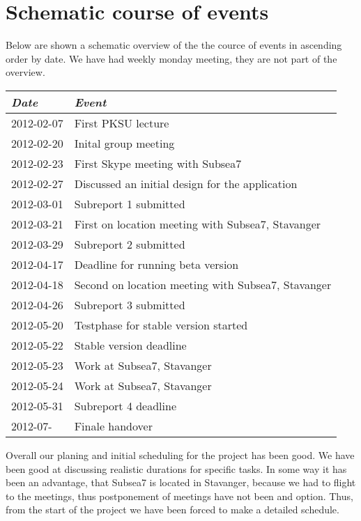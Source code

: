 \section{Schematic course of events }
Below are shown a schematic overview of the the cource of events in ascending order by date. We have had weekly monday meeting, they are not part of the overview.
\begin{center}
    \begin{tabular}{ll}
    \emph{Date} & \emph{Event} \\ \hline
    2012-02-07  & First PKSU lecture \\ 
    2012-02-20  & Inital group meeting \\ 
    2012-02-23  & First Skype meeting with Subsea7\\
    2012-02-27  & Discussed an initial design for the application\\
    2012-03-01  & Subreport 1 submitted \\
    2012-03-21  & First on location meeting with Subsea7, Stavanger \\
    2012-03-29  & Subreport 2 submitted \\
    2012-04-17  & Deadline for running beta version \\
    2012-04-18  & Second on location meeting with Subsea7, Stavanger \\
    2012-04-26  & Subreport 3 submitted \\
    2012-05-20  & Testphase for stable version started \\
    2012-05-22  & Stable version deadline \\
    2012-05-23  & Work at Subsea7, Stavanger \\
    2012-05-24  & Work at Subsea7, Stavanger \\
    2012-05-31  & Subreport 4 deadline \\
    2012-07-    & Finale handover \\
    \end{tabular}
\end{center}

Overall our planing and initial scheduling for the project has been good. 
We have been good at discussing realistic durations for specific tasks. 
In some way it has been an advantage, that Subsea7 is located in Stavanger, 
because we had to flight to the meetings, thus postponement of meetings have not 
been and option.
Thus, from the start of the project we have been forced to make a detailed schedule.
